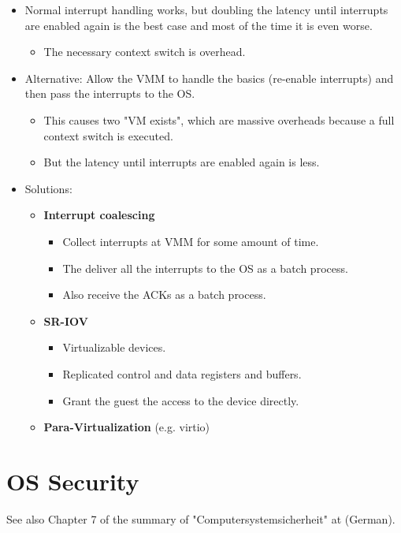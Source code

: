 	        \begin{itemize}
	        	\item Normal interrupt handling works, but doubling the latency until interrupts are enabled again is the best case and most of the time it is even worse.
		        	\begin{itemize}
		        		\item The necessary context switch is overhead.
		        	\end{itemize}
	        	\item Alternative: Allow the VMM to handle the basics (re-enable interrupts) and then pass the interrupts to the OS.
		        	\begin{itemize}
		        		\item This causes two "VM exists", which are massive overheads because a full context switch is executed.
		        		\item But the latency until interrupts are enabled again is less.
		        	\end{itemize}
	        	\item Solutions:
		        	\begin{itemize}
		        		\item \textbf{Interrupt coalescing}
			        		\begin{itemize}
			        			\item Collect interrupts at VMM for some amount of time.
			        			\item The deliver all the interrupts to the OS as a batch process.
			        			\item Also receive the ACKs as a batch process.
			        		\end{itemize}
		        		\item \textbf{SR-IOV}
			        		\begin{itemize}
			        			\item Virtualizable devices.
			        			\item Replicated control and data registers and buffers.
			        			\item Grant the guest the access to the device directly.
			        		\end{itemize}
		        		\item \textbf{Para-Virtualization} (e.g. virtio)
		        	\end{itemize}
	        \end{itemize}

\chapter{OS Security}
    See also Chapter 7 of the summary of "Computersystemsicherheit" at  (German).


